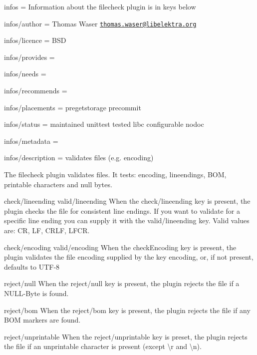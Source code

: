 
\begin{DoxyItemize}
\item infos = Information about the filecheck plugin is in keys below
\item infos/author = Thomas Waser \href{mailto:thomas.waser@libelektra.org}{\tt thomas.\+waser@libelektra.\+org}
\item infos/licence = B\+SD
\item infos/provides =
\item infos/needs =
\item infos/recommends =
\item infos/placements = pregetstorage precommit
\item infos/status = maintained unittest tested libc configurable nodoc
\item infos/metadata =
\item infos/description = validates files (e.\+g. encoding)
\end{DoxyItemize}

The filecheck plugin validates files. It tests\+: encoding, lineendings, B\+OM, printable characters and null bytes.

{\ttfamily check/lineending} {\ttfamily valid/lineending} When the {\ttfamily check/lineending} key is present, the plugin checks the file for consistent line endings. If you want to validate for a specific line ending you can supply it with the {\ttfamily valid/lineending} key. Valid values are\+: {\ttfamily CR}, {\ttfamily LF}, {\ttfamily C\+R\+LF}, {\ttfamily L\+F\+CR}.

{\ttfamily check/encoding} {\ttfamily valid/encoding} When the {\ttfamily check\+Encoding} key is present, the plugin validates the file encoding supplied by the key {\ttfamily encoding}, or, if not present, defaults to {\ttfamily U\+T\+F-\/8}

{\ttfamily reject/null} When the {\ttfamily reject/null} key is present, the plugin rejects the file if a N\+U\+L\+L-\/\+Byte is found.

{\ttfamily reject/bom} When the {\ttfamily reject/bom} key is present, the plugin rejects the file if any B\+OM markers are found.

{\ttfamily reject/unprintable} When the {\ttfamily reject/unprintable} key is preset, the plugin rejects the file if an unprintable character is present (except {\ttfamily \textbackslash{}r} and {\ttfamily \textbackslash{}n}). 